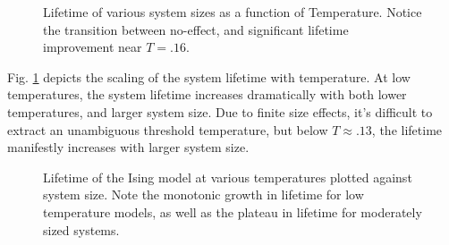 \documentclass[twocolumn,superscriptaddress,aps,prb,floatfix]{revtex4-1}
\newcommand{\figref}[1]{Fig. \ref{#1}}
\begin{document}
\begin{figure}
\begin{center}
\end{center}
\caption{Lifetime of various system sizes as a function of Temperature.  Notice the transition between no-effect, and significant lifetime improvement near $T=.16$.}
\label{fig:LifetimeVsTemperature}
\end{figure}

\figref{fig:LifetimeVsTemperature} depicts the scaling of the system lifetime with temperature.  At low temperatures, the system lifetime increases dramatically with both lower temperatures, and larger system size.  Due to finite size effects, it's difficult to extract an unambiguous threshold temperature, but below $T\approx.13$, the lifetime manifestly increases with larger system size.  

\begin{figure}
\begin{center}
\end{center}
\caption{Lifetime of the Ising model at various temperatures plotted against system size.  Note the monotonic growth in lifetime for low temperature models, as well as the plateau in lifetime for moderately sized systems.}
\label{fig:LifetimeVsSystemSize}
\end{figure}
\end{document}

